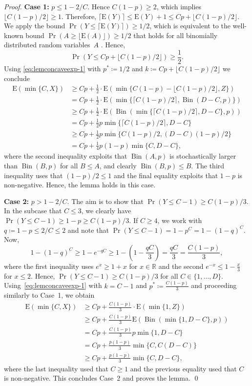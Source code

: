\documentclass[11pt, a4paper]{article}
\DeclareMathOperator{\Prob}{Pr}
\newcommand*{\E}{\mathrm{E}}
\DeclareMathOperator{\Bin}{Bin}
\newcommand{\R}{\mathds{R}}
\begin{document}
\begin{proof}
\textbf{Case 1: }$p\le 1-2/C$. 
Hence $C(1-p)\ge 2$, which implies $\lfloor C(1-p)/2\rfloor\ge 1$. Therefore, 
$\lceil \E(Y)\rceil \le \E(Y)+1 \le Cp + \lfloor C(1-p)/2\rfloor$.
We apply the bound 
$\Prob(Y\le \lceil\E(Y)\rceil)\ge 1/2$, which is equivalent to the well-known 
bound $\Prob(A\ge \lfloor\E(A)\rfloor)\ge 1/2$ that holds for 
all binomially distributed random variables~$A$ \cite{KassBuhrmanMeanMedianMode}.  Hence, 
\[
\Prob(Y\le Cp + \lfloor C(1-p)/2\rfloor)\ge \frac{1}{2}. 
\]
Using \eqref{eq:lemconcaveexp-1} with $p^*\coloneqq 1/2$ and $k\coloneqq Cp + \lfloor C(1-p)/2\rfloor$ we conclude 
\begin{align*}
\E(\min\{C,X\}) & \ge Cp + \frac{1}{2}  \cdot \E(\min\{C(1-p)-\lfloor C(1-p)/2\rfloor,Z\}) \\ 
 & = Cp + \frac{1}{2}  \cdot \E(\min\{\lceil C(1-p)/2\rceil,\Bin(D-C,p)\}) \\
& \ge Cp+ \frac{1}{2}  \cdot \E(\Bin(\min\{\lceil C(1-p)/2\rceil,D-C\},p)) \\
& = Cp + \frac{1}{2} p \min\{\lceil  C(1-p)/2\rceil, D-C\} \\ 
& \ge Cp+ \frac{1}{2} p \min\{C(1-p)/2,(D-C)(1-p)/2\}  \\
&  = Cp + \frac{1}{4}p(1-p) \min\{C,D-C\},
\end{align*}
where the second inequality exploits that $\Bin(A,p)$ is stochastically larger 
than $\Bin(B,p)$ for all $B\le A$, and clearly $\Bin(B,p)\le B$. The third inequality 
uses that  $(1-p)/2\le 1$ and the final equality exploits that $1-p$ is non-negative. 
Hence, the lemma holds in this case.

\textbf{Case 2: }$p > 1-2/C$. The aim is to show 
that $\Pr(Y\le C-1)\ge C(1-p)/3$. In the subcase that $C\le 3$, we clearly have $\Prob(Y\le C-1)\ge 1-p \ge C(1-p)/3$. 
If $C\ge 4$,  we work with $q\coloneqq 1-p\le 2/C\le 2$ and 
note that $\Pr(Y\le C-1) = 1 - p^C = 1-(1-q)^C$. Now, 
\[
1-(1-q)^C \ge 1-e^{-qC} \ge 1-\left(1-\frac{qC}{3}\right) = \frac{qC}{3} = \frac{C(1-p)}{3},
\]
where the first inequality uses $e^{x}\ge 1+x$ for $x\in\R$ and the second 
$e^{-x}\le 1-\frac{x}{3}$ for $x\le 2$. Hence, $\Pr(Y\le C-1)\ge C(1-p)/3$ for all 
$C\in\{1,\dots,D\}$. 
Using~\eqref{eq:lemconcaveexp-1} 
with $k=C-1$ and $p^*\coloneqq \frac{C(1-p)}{3}$ and proceeding similarly to Case~1, we obtain
\begin{align*}
\E(\min\{C,X\}) & \ge Cp + \frac{C(1-p)}{3}  \cdot \E(\min\{1,Z\}) \\
& \ge Cp + \frac{C(1-p)}{3} \E(\Bin(\min\{1,D-C\},p)) \\
& = Cp + \frac{C(1-p)}{3} p \min\{1,D-C\} \\ 
& = Cp + \frac{p(1-p)}{3}  \min\{C,C(D-C)\} \\
& \ge Cp + \frac{p(1-p)}{3}  \min\{C,D-C\} ,
\end{align*}
where the last inequality used that $C\ge 1$ and the previous equality used that $C$ is non-negative. 
This concludes Case~2 and proves the lemma.
\qed\end{proof}
\end{document}
